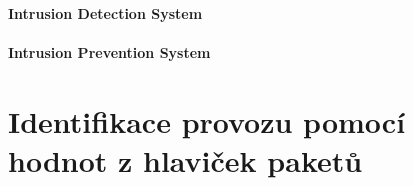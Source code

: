 \paragraph*{Intrusion Detection System} 

\paragraph*{Intrusion Prevention System} 


\section{Identifikace provozu pomocí hodnot z hlaviček paketů}

